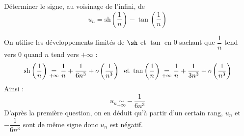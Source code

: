 \documentclass[a4paper,10pt]{report}
\begin{document}
\begin{Exercice}{} D\'{e}terminer le signe, au voisinage de l'infini, de 
$$u_{n}=\text{sh}\left( \dfrac{1}{n}\right) -\tan \left( \dfrac{1}{n}\right)$$
\end{Exercice}

\corr On utilise les développements limités de $\sh$ et $\tan$ en $0$ sachant que $\dfrac{1}{n}$ tend vers $0$ quand $n$ tend vers $+ \infty$ : 
$$\textrm{sh} \left(\dfrac{1}{n} \right) \underset{+ \infty}{=} \dfrac{1}{n} + \dfrac{1}{{6n^3 }} + o\left( {\dfrac{1}{{n^3 }}} \right) \; \hbox{ et } \tan \left(\dfrac{1}{n}\right) \underset{+ \infty}{=} \dfrac{1}{n} + \dfrac{1}{{3n^3 }} + o\left( {\dfrac{1}{{n^3 }}} \right)$$
Ainsi :
$$u_n  \underset{+ \infty}{\sim } - \dfrac{1}{{6n^3 }}$$
D'après la première question, on en déduit qu'à partir d'un certain rang, $u_n$ et $ - \dfrac{1}{{6n^3 }}$ sont de même signe donc $u_n$ est négatif.
\end{document}
